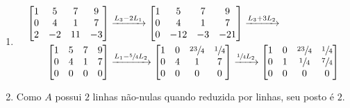 \documentclass[leqno]{article}
\begin{document}
\begin{enumerate}
    \begin{enumerate}
        \item \begin{align*}
            \begin{bmatrix}
    1 & 5 & 7 & 9\\
    0 & 4 & 1 & 7\\
    2 & -2 & 11 & -3\\
    \end{bmatrix}&\xrightarrow{L_3-2L_1}\begin{bmatrix}
    1 & 5 & 7 & 9\\
    0 & 4 & 1 & 7\\
    0 & -12 & -3 & -21\\
    \end{bmatrix}\xrightarrow{L_3+3L_2}\\
    \begin{bmatrix}
    1 & 5 & 7 & 9\\
    0 & 4 & 1 & 7\\
    0 & 0 & 0 & 0\\
    \end{bmatrix}&\xrightarrow{L_1-\sfrac{5}{4}L_2}\begin{bmatrix}
    1 & 0 & \sfrac{23}{4} & \sfrac{1}{4}\\
    0 & 4 & 1 & 7\\
    0 & 0 & 0 & 0\\
    \end{bmatrix}\xrightarrow{\sfrac{1}{4}L_2}\begin{bmatrix}
    1 & 0 & \sfrac{23}{4} & \sfrac{1}{4}\\
    0 & 1 & \sfrac{1}{4} & \sfrac{7}{4}\\
    0 & 0 & 0 & 0\\
    \end{bmatrix}
        \end{align*}
        
        \item Como $A$ possui $2$ linhas não-nulas quando reduzida por linhas, seu posto é $2$.
        

\end{enumerate}
\end{enumerate}
\end{document}
